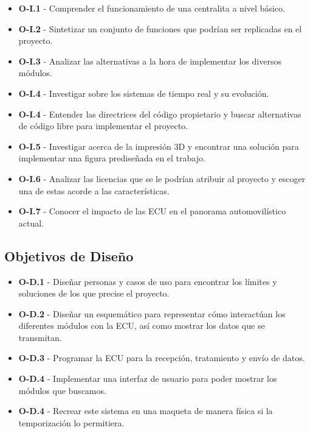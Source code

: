 \begin{itemize}
    \item \textbf{O-I.1} - Comprender el funcionamiento de una centralita a nivel básico.
    \item \textbf{O-I.2} - Sintetizar un conjunto de funciones que podrían ser replicadas en el proyecto.
    \item \textbf{O-I.3} - Analizar las alternativas a la hora de implementar los diversos módulos.
    \item \textbf{O-I.4} - Investigar sobre los sistemas de tiempo real y su evolución.
    \item \textbf{O-I.4} - Entender las directrices del código propietario y buscar alternativas de código libre para implementar el proyecto.
    \item \textbf{O-I.5} - Investigar acerca de la impresión 3D y encontrar una solución para implementar una figura prediseñada en el trabajo.
    \item \textbf{O-I.6} - Analizar las licencias que se le podrían atribuir al proyecto y escoger una de estas acorde a las características.
    \item \textbf{O-I.7} - Conocer el impacto de las ECU en el panorama automovilístico actual. 
\end{itemize}

\subsection{Objetivos de Diseño}
\begin{itemize}
    \item \textbf{O-D.1} - Diseñar personas y casos de uso para encontrar los límites y soluciones de los que precise el proyecto.
    \item \textbf{O-D.2} - Diseñar un esquemático para representar cómo interactúan los diferentes módulos con la ECU, así como mostrar los datos que se transmitan.
    \item \textbf{O-D.3} - Programar la ECU para la recepción, tratamiento y envío de datos.
    \item \textbf{O-D.4} - Implementar una interfaz de usuario para poder mostrar los módulos que buscamos.
    \item \textbf{O-D.4} - Recrear este sistema en una maqueta de manera física si la temporización lo permitiera.
\end{itemize}